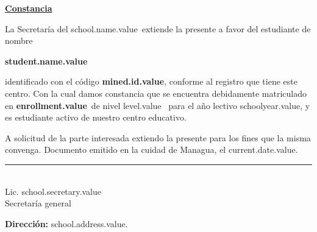 \documentclass[12pt]{article}
\newcommand{\schoolName}{school.name.value}
\newcommand{\schoolAddress}{school.address.value}
\newcommand{\schoolSecretary}{school.secretary.value}
\newcommand{\enrollmentName}{enrollment.value}
\newcommand{\levelName}{level.value}
\newcommand{\minedId}{mined.id.value}
\newcommand{\studentName}{student.name.value}
\newcommand{\schoolYear}{schoolyear.value}
\newcommand{\currentDate}{current.date.value}
\begin{document}
    \begin{center}
        \underline{\textbf{\Large Constancia}}
    \end{center}
    
    La Secretaría del \schoolName\ extiende la presente a favor del estudiante de nombre 
    \begin{center}
        \textbf{\studentName}
    \end{center}
    identificado con el código \textbf{\minedId}, conforme al registro que tiene este centro.
    Con la cual damos constancia que se encuentra debidamente matriculado
    en \textbf{\enrollmentName}~de nivel \levelName~ para el año lectivo \schoolYear, y es estudiante activo de nuestro centro educativo.

    \vspace{0.5cm}
    A solicitud de la parte interesada extiendo la presente para los fines que la misma convenga.
    Documento emitido en la cuidad de Managua, el \currentDate.
    
    \vfill
    \begin{center}
        \rule{5cm}{0.4pt}\\[1mm]
        Lic. \schoolSecretary\\
        Secretaría general
    \end{center}
    \vspace{2.5cm}

    \textbf{Dirección:} \schoolAddress.
\end{document}

